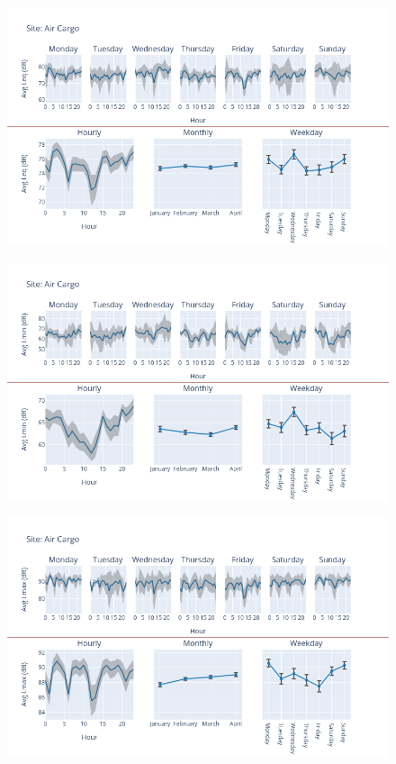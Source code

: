 \documentclass[12pt, oneside]{book}
\begin{document}
{ 
{\begin{figure}[H] 
 \centering 
\includegraphics[width=.88\textwidth, keepaspectratio]{image47} 
 \end{figure}}{} 

{\begin{figure}[H] 
 \centering 
\includegraphics[width=.88\textwidth, keepaspectratio]{image48} 
 \end{figure}}{} 

{\begin{figure}[H] 
 \centering 
\includegraphics[width=.88\textwidth, keepaspectratio]{image49} 
 \end{figure}}{} 

}
\end{document}
